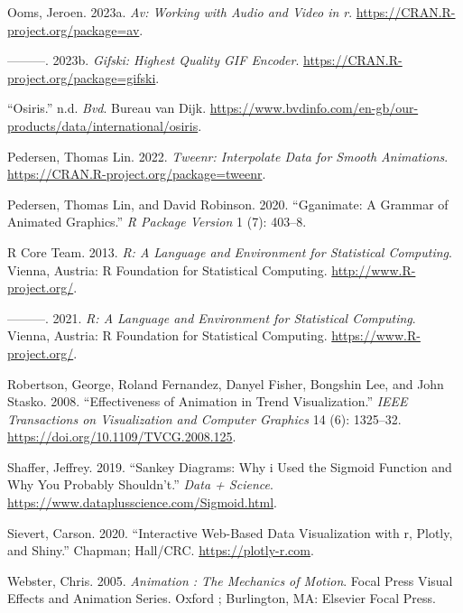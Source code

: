 \begin{CSLReferences}{1}{0}
\leavevmode{}%
Ooms, Jeroen. 2023a. \emph{Av: Working with Audio and Video in r}. \url{https://CRAN.R-project.org/package=av}.

\leavevmode{}%
---------. 2023b. \emph{Gifski: Highest Quality GIF Encoder}. \url{https://CRAN.R-project.org/package=gifski}.

\leavevmode{}%
{``Osiris.''} n.d. \emph{Bvd}. Bureau van Dijk. \url{https://www.bvdinfo.com/en-gb/our-products/data/international/osiris}.

\leavevmode{}%
Pedersen, Thomas Lin. 2022. \emph{Tweenr: Interpolate Data for Smooth Animations}. \url{https://CRAN.R-project.org/package=tweenr}.

\leavevmode{}%
Pedersen, Thomas Lin, and David Robinson. 2020. {``Gganimate: A Grammar of Animated Graphics.''} \emph{R Package Version} 1 (7): 403--8.

\leavevmode{}%
R Core Team. 2013. \emph{R: A Language and Environment for Statistical Computing}. Vienna, Austria: R Foundation for Statistical Computing. \url{http://www.R-project.org/}.

\leavevmode{}%
---------. 2021. \emph{R: A Language and Environment for Statistical Computing}. Vienna, Austria: R Foundation for Statistical Computing. \url{https://www.R-project.org/}.

\leavevmode{}%
Robertson, George, Roland Fernandez, Danyel Fisher, Bongshin Lee, and John Stasko. 2008. {``Effectiveness of Animation in Trend Visualization.''} \emph{IEEE Transactions on Visualization and Computer Graphics} 14 (6): 1325--32. \url{https://doi.org/10.1109/TVCG.2008.125}.

\leavevmode{}%
Shaffer, Jeffrey. 2019. {``Sankey Diagrams: Why i Used the Sigmoid Function and Why You Probably Shouldn't.''} \emph{Data + Science}. \url{https://www.dataplusscience.com/Sigmoid.html}.

\leavevmode{}%
Sievert, Carson. 2020. {``Interactive {Web-Based} Data Visualization with r, Plotly, and Shiny.''} Chapman; Hall/CRC. \url{https://plotly-r.com}.

\leavevmode{}%
Webster, Chris. 2005. \emph{Animation : The Mechanics of Motion}. Focal Press Visual Effects and Animation Series. Oxford ; Burlington, MA: Elsevier Focal Press.


\end{CSLReferences}

